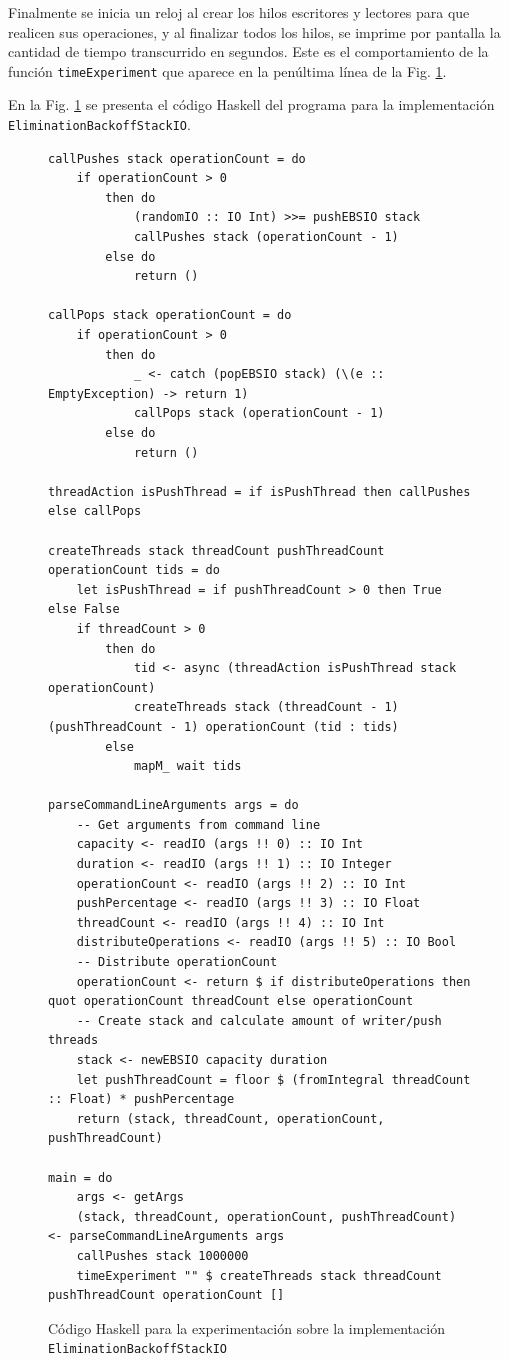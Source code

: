 Finalmente se inicia un reloj al crear los hilos escritores y lectores para que realicen sus operaciones, y al finalizar todos los hilos, se imprime por pantalla la cantidad de tiempo transcurrido en segundos. Este es el comportamiento de la función \texttt{timeExperiment} que aparece en la penúltima línea de la Fig. \ref{fig:expEBSIO}.

En la Fig. \ref{fig:expEBSIO} se presenta el código Haskell del programa para la implementación \texttt{EliminationBackoffStackIO}.

\begin{figure}[!h]
    \centering
    \begin{verbatim}
callPushes stack operationCount = do
    if operationCount > 0
        then do
            (randomIO :: IO Int) >>= pushEBSIO stack
            callPushes stack (operationCount - 1)
        else do
            return ()

callPops stack operationCount = do
    if operationCount > 0
        then do
            _ <- catch (popEBSIO stack) (\(e :: EmptyException) -> return 1)
            callPops stack (operationCount - 1)
        else do
            return ()

threadAction isPushThread = if isPushThread then callPushes else callPops

createThreads stack threadCount pushThreadCount operationCount tids = do
    let isPushThread = if pushThreadCount > 0 then True else False
    if threadCount > 0
        then do
            tid <- async (threadAction isPushThread stack operationCount)
            createThreads stack (threadCount - 1) (pushThreadCount - 1) operationCount (tid : tids)
        else
            mapM_ wait tids

parseCommandLineArguments args = do
    -- Get arguments from command line
    capacity <- readIO (args !! 0) :: IO Int
    duration <- readIO (args !! 1) :: IO Integer
    operationCount <- readIO (args !! 2) :: IO Int
    pushPercentage <- readIO (args !! 3) :: IO Float
    threadCount <- readIO (args !! 4) :: IO Int
    distributeOperations <- readIO (args !! 5) :: IO Bool
    -- Distribute operationCount
    operationCount <- return $ if distributeOperations then quot operationCount threadCount else operationCount
    -- Create stack and calculate amount of writer/push threads
    stack <- newEBSIO capacity duration
    let pushThreadCount = floor $ (fromIntegral threadCount :: Float) * pushPercentage
    return (stack, threadCount, operationCount, pushThreadCount)

main = do
    args <- getArgs
    (stack, threadCount, operationCount, pushThreadCount) <- parseCommandLineArguments args
    callPushes stack 1000000
    timeExperiment "" $ createThreads stack threadCount pushThreadCount operationCount []
    \end{verbatim}
    \caption{Código Haskell para la experimentación sobre la implementación \texttt{EliminationBackoffStackIO}}
    \label{fig:expEBSIO}
\end{figure}

